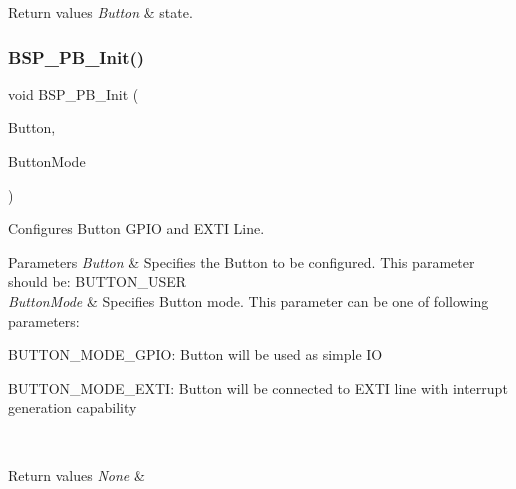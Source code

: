 \begin{DoxyRetVals}{Return values}
{\em Button} & state. \\
\hline
\end{DoxyRetVals}
\mbox{\label{group___s_t_m32_f0_x_x___n_u_c_l_e_o___b_u_t_t_o_n___functions_gad31c8db50a71c1f6dbfe132d72ba0bc6}} 
\subsubsection{\texorpdfstring{B\+S\+P\+\_\+\+P\+B\+\_\+\+Init()}{BSP\_PB\_Init()}}
{\footnotesize\ttfamily void B\+S\+P\+\_\+\+P\+B\+\_\+\+Init (\begin{DoxyParamCaption}\item[{Button\+\_\+\+Type\+Def}]{Button,  }\item[{Button\+Mode\+\_\+\+Type\+Def}]{Button\+Mode }\end{DoxyParamCaption})}



Configures Button G\+P\+IO and E\+X\+TI Line. 


\begin{DoxyParams}{Parameters}
{\em Button} & Specifies the Button to be configured. This parameter should be\+: B\+U\+T\+T\+O\+N\+\_\+\+U\+S\+ER \\
\hline
{\em Button\+Mode} & Specifies Button mode. This parameter can be one of following parameters\+: \begin{DoxyItemize}
\item B\+U\+T\+T\+O\+N\+\_\+\+M\+O\+D\+E\+\_\+\+G\+P\+IO\+: Button will be used as simple IO \item B\+U\+T\+T\+O\+N\+\_\+\+M\+O\+D\+E\+\_\+\+E\+X\+TI\+: Button will be connected to E\+X\+TI line with interrupt generation capability \end{DoxyItemize}
\\
\hline
\end{DoxyParams}

\begin{DoxyRetVals}{Return values}
{\em None} & \\
\hline
\end{DoxyRetVals}
